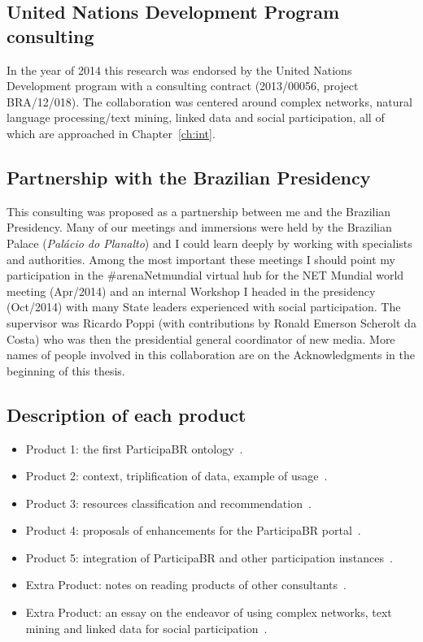 \begin{apendicesenv}
\section{United Nations Development Program consulting}\label{sec:undp}
In the year of 2014 this research was endorsed by the United Nations Development program
with a consulting contract (2013/00056, project BRA/12/018).
The collaboration was centered around complex networks,
natural language processing/text mining, linked data and social participation,
all of which are approached in Chapter~\ref{ch:int}.

\subsection{Partnership with the Brazilian Presidency}
This consulting was proposed as a partnership between me
and the Brazilian Presidency.
Many of our meetings and immersions were held by the Brazilian Palace (\emph{Palácio do Planalto})
and I could learn deeply by working with specialists and authorities.
Among the most important these meetings I should point
my participation in the \#arenaNetmundial virtual hub for the NET Mundial world meeting (Apr/2014)
and an internal Workshop I headed in the presidency (Oct/2014) with many State leaders experienced with social participation.
The supervisor was Ricardo Poppi (with contributions by Ronald Emerson Scherolt da Costa)
who was then the presidential general coordinator of new media.
More names of people involved in this collaboration are on the Acknowledgments in the beginning of this thesis.

\subsection{Description of each product}
\begin{itemize}
	\item Product 1: the first ParticipaBR ontology~\cite{opa0}.
	\item Product 2: context, triplification of data, example of usage~\cite{pnud2}.
	\item Product 3: resources classification and recommendation~\cite{pnud3}.
	\item Product 4: proposals of enhancements for the ParticipaBR portal~\cite{pnud4}.
	\item Product 5: integration of ParticipaBR and other participation instances~\cite{opa}.
	\item Extra Product: notes on reading products of other consultants~\cite{pnudExtra}.
	\item Extra Product: an essay on the endeavor of using complex networks, text mining and linked data for social participation~\cite{ensaio}.
\end{itemize}


\end{apendicesenv}
